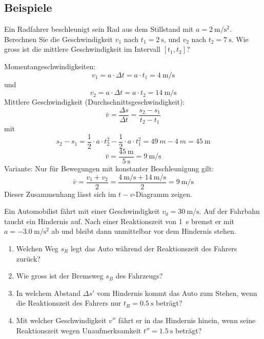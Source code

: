 \subsection{Beispiele}
\begin{example}
Ein Radfahrer beschleunigt sein Rad aus dem Stillstand mit $a=\SI{2}{\metre \per \second \squared}$. Berechnen Sie die Geschwindigkeit $v_{1}$ nach $t_{1} = \SI{2}{\second}$, und $v_{2}$ nach $t_{2}=\SI{7}{\second}$. Wie gross ist die mittlere Geschwindigkeit im Intervall $[t_{1},t_{2}]$?
\end{example}
\begin{solution}
Momentangeschwindigkeiten: 
\[v_{1}=a \cdot \Delta t = a \cdot t_{1} = \SI{4}{\metre \per \second} \] und 
\[ v_{2} = a \cdot \Delta t = a \cdot t_{2} = \SI{14}{\metre \per \second} \] 
Mittlere Geschwindigkeit (Durchschnittsgeschwindigkeit):
\[ \bar{v} = \frac{\Delta s}{\Delta t} = \frac{s_{2}-s_{1}}{t_{2}-t_{1}}\]
mit
\[ s_{2}-s_{1} = \frac{1}{2} \cdot a \cdot t_{2}^{2}-\frac{1}{2}\cdot a \cdot t_{1}^{2}= \SI{49}{m} - \SI{4}{m} = \SI{45}{\metre}\]
\[ \bar{v} = \frac{\SI{45}{\metre}}{\SI{5}{\second}} = \SI{9}{\metre \per \second} \]
Variante: Nur für Bewegungen mit konstanter Beschleunigung gilt:
\[ \bar{v} = \frac{v_{1} + v_{2}}{2} = \frac{\SI{4}{\metre \per \second} + \SI{14}{\metre \per \second}}{2} = \SI{9}{\metre \per \second} \]
Dieser Zusammenhang lässt sich im $t-v$-Diagramm zeigen.
\end{solution}

\begin{example}
Ein Automobilist fährt mit einer Geschwindigkeit $v_{0} = \SI{30}{\metre \per \second}$. Auf der Fahrbahn taucht ein Hindernis auf. Nach einer Reaktionszeit von \SI{1}{\second} bremst er mit $a=\SI{-3.0}{\metre \per \second \squared}$ ab und bleibt dann unmittelbar vor dem Hindernis stehen.
\begin{enumerate}
\item Welchen Weg $s_{R}$ legt das Auto während der Reaktionszeit des Fahrers zurück?
\item Wie gross ist der Bremsweg $s_{B}$ des Fahrzeugs?
\item In welchem Abstand $\Delta s'$ vom Hindernis kommt das Auto zum Stehen, wenn die Reaktionszeit des Fahrers nur $t_{R} = \SI{0.5}{\second}$ beträgt?
\item Mit welcher Geschwindigkeit $v''$ fährt er in das Hindernis hinein, wenn seine Reaktionszeit wegen Unaufmerksamkeit $t''=\SI{1.5}{\second}$ beträgt?
\end{enumerate}
\end{example}

